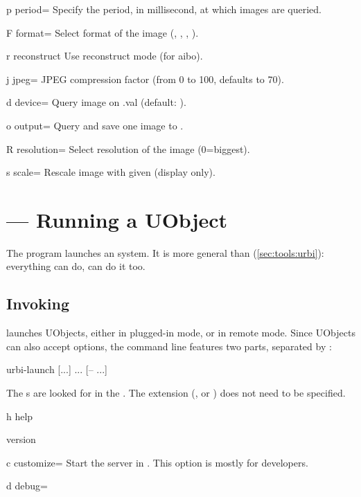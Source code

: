 \begin{options}[Tuning]
\item[p]{period=} Specify the period, in millisecond, at
  which images are queried.
\item[F]{format=} Select format of the image (,
  , , ).
\item[r]{reconstruct} Use reconstruct mode (for aibo).
\item[j]{jpeg=} JPEG compression factor (from 0 to 100,
  defaults to 70).
\item[d]{device=} Query image on .val
  (default: ).
\item[o]{output=} Query and save one image to .
\item[R]{resolution=} Select resolution of the image
  (0=biggest).
\item[s]{scale=} Rescale image with given 
  (display only).
\end{options}


\section{ --- Running a UObject}
\label{sec:tools:urbi-launch}

The  program launches an \urbi system.  It is
more general than  (\autoref{sec:tools:urbi}):
everything  can do,  can do it too.

\subsection{Invoking }

 launches UObjects, either in plugged-in mode, or
in remote mode.  Since UObjects can also accept options, the command
line features two parts, separated by \samp{--}:

\begin{shell}
urbi-launch [...] ... [-- ...]
\end{shell}

The s are looked for in the .  The
 extension (, or ) does not need to be
specified.

\begin{options}
\item[h]{help} \optionHelp
\item{version} \optionVersion
\item[c]{customize=} Start the \urbi server in
  .  This option is mostly for developers.
\item[d]{debug=} \optionDebug
\end{options}

